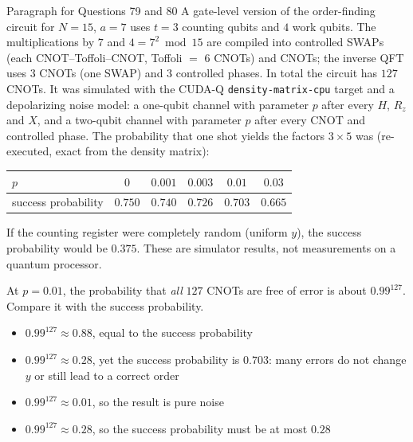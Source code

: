 \documentclass[11pt,a4paper]{article}
\newcommand{\optlabel}[1]{\textbf{(#1)}}
\newenvironment{qitem}[1]{\begin{list}{}{\setlength{\leftmargin}{3.3em}\setlength{\labelwidth}{3.1em}%
  \setlength{\labelsep}{0.2em}\setlength{\topsep}{3pt}\setlength{\parsep}{3pt}}\item[\textbf{Q.#1}\hfill]}{\end{list}}
\newcommand{\qsep}{\par\vspace{2pt}{\color{black!15}\hrule}\vspace{4pt}}
\begin{document}
\begin{passagebox}{Paragraph for Questions 79 and 80}
A gate-level version of the order-finding circuit for $N = 15$, $a = 7$ uses $t = 3$ counting qubits and $4$ work qubits. The
multiplications by $7$ and $4 = 7^2 \bmod 15$ are compiled into controlled SWAPs (each CNOT--Toffoli--CNOT, Toffoli $=$ 6 CNOTs) and CNOTs; the
inverse QFT uses $3$ CNOTs (one SWAP) and $3$ controlled phases. In total the circuit has $127$ CNOTs. It was simulated with the CUDA-Q
\texttt{density-matrix-cpu} target and a depolarizing noise model: a one-qubit channel with parameter $p$ after every $H$, $R_z$ and $X$, and a
two-qubit channel with parameter $p$ after every CNOT and controlled phase. The probability that one shot yields the factors $3 \times 5$ was
(re-executed, exact from the density matrix):
\begin{center}\begin{tabular}{lccccc}\toprule
$p$ & $0$ & $0.001$ & $0.003$ & $0.01$ & $0.03$\\\midrule
success probability & $0.750$ & $0.740$ & $0.726$ & $0.703$ & $0.665$\\\bottomrule
\end{tabular}\end{center}
If the counting register were completely random (uniform $y$), the success probability would be $0.375$. These are simulator results, not
measurements on a quantum processor.
\end{passagebox}
\begin{qitem}{79}
At $p = 0.01$, the probability that \emph{all} $127$ CNOTs are free of error is about $0.99^{127}$. Compare it with the success probability.
\begin{itemize}[leftmargin=2.6em, labelsep=0.4em, itemsep=2pt, topsep=3pt]
\item[\optlabel{A}] $0.99^{127} \approx 0.88$, equal to the success probability
\item[\optlabel{B}] $0.99^{127} \approx 0.28$, yet the success probability is $0.703$: many errors do not change $y$ or still lead to a correct order
\item[\optlabel{C}] $0.99^{127} \approx 0.01$, so the result is pure noise
\item[\optlabel{D}] $0.99^{127} \approx 0.28$, so the success probability must be at most $0.28$
\end{itemize}
\end{qitem}
\qsep
\end{document}
